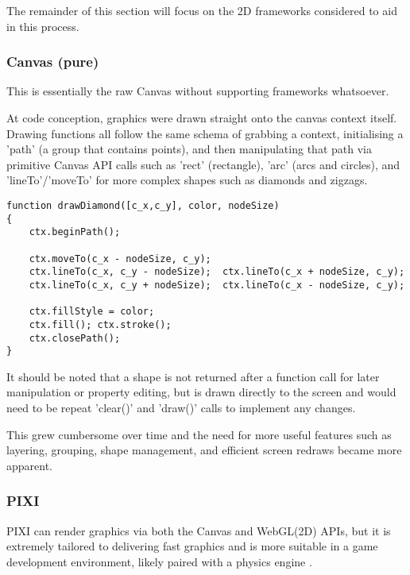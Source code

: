 The remainder of this section will focus on the 2D frameworks considered to aid in this process.


\subsubsection{Canvas (pure)}

This is essentially the raw Canvas without supporting frameworks whatsoever.  

At code conception, graphics were drawn straight onto the canvas context itself. Drawing functions all follow the same schema of grabbing a context, initialising a 'path' (a group that contains points), and then manipulating that path via primitive Canvas API calls such as 'rect' (rectangle), 'arc' (arcs and circles), and 'lineTo'/'moveTo' for more complex shapes such as diamonds and zigzags. 

\pagebreak
\begingroup
\begin{spacing}{1}
\begin{lstlisting}[label=code:canvasapi]
function drawDiamond([c_x,c_y], color, nodeSize)
{
    ctx.beginPath();

    ctx.moveTo(c_x - nodeSize, c_y); 
    ctx.lineTo(c_x, c_y - nodeSize);  ctx.lineTo(c_x + nodeSize, c_y); 
    ctx.lineTo(c_x, c_y + nodeSize);  ctx.lineTo(c_x - nodeSize, c_y);
    
    ctx.fillStyle = color; 
    ctx.fill(); ctx.stroke();
    ctx.closePath();
}
\end{lstlisting}
\vspace{-10pt}
\end{spacing}
\endgroup

It should be noted that a shape is not returned after a function call for later manipulation or property editing, but is drawn directly to the screen and would need to be repeat 'clear()' and 'draw()' calls to implement any changes.

This grew cumbersome over time and the need for more useful features such as layering, grouping, shape management, and efficient screen redraws became more apparent. 

\subsubsection{PIXI}

PIXI can render graphics via both the Canvas and WebGL(2D) APIs, but it is extremely tailored to delivering fast graphics and is more suitable in a game development environment, likely paired with a physics engine \cite{pixi}.

